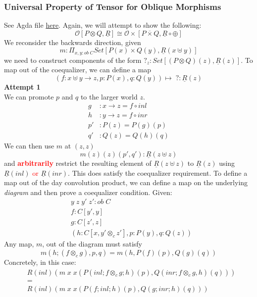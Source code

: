 \documentclass{article}
\newcommand{\red}[1]{\textcolor{red}{#1}}
\begin{document}
\subsubsection{Universal Property of Tensor for Oblique Morphisms}
See Agda file \href{https://github.com/bond15/Bunched-CBPV/blob/cc0cb155be26ca383343247485e462ec2377dfe6/src/Data/ConcreteFin.agda#L85}{here}.
Again, we will attempt to show the following:
\[
    \mathcal{O}[P \otimes Q , \underline{R}] \cong \mathcal{O\times}[P \overline{\times} Q , \underline{R} \circ \oplus]  
\]
We reconsider the backwards direction, given 
\[
    m : \Pi_{x , y : ob \;C} Set[P(x)\times Q(y), \underline{R}(x \uplus y)]
\]
we need to construct components of the form $?_z : Set[(P\otimes Q)(z),  \underline{R}(z)]$. 
To map out of the coequalizer, we can define a map
\[
    (f: x\uplus y \rightarrow z , p : P(x), q : Q(y)) \mapsto \; ? : \underline{R}(z)
\]
\textbf{Attempt 1}\\
We can promote $p$ and $q$ to the larger world $z$.
\begin{align*}
    g &: x \rightarrow z = f \circ inl \\
    h &: y \rightarrow z = f \circ inr \\
    p' &: P(z) = P(g)(p)\\
    q' &: Q(z) = Q(h)(q)
\end{align*}
We can then use $m$ at $(z , z)$
\[ 
    m(z)(z)(p' , q') : \underline{R}(z \uplus z)
\]
and \red{\textbf{arbitrarily}} restrict the resulting element of $\underline{R}(z \uplus z)$ to $\underline{R}(z)$ 
using $\underline{R}(inl)$ \red{or} $\underline{R}(inr)$. This does satisfy the coequalizer requirement. 
To define a map out of the day convolution product, we can define a map on the underlying \textit{diagram}
 and then prove a coequalizer condition. Given:
 \begin{align*}
    &y \;z \;y'\; z' : ob \;C \\
    &f : C[y' , y] \\ 
    &g : C[z' , z] \\
    &(h : C[x , y'\otimes_c z'], p : P(y), q: Q(z))
 \end{align*}
Any map, $m$, out of the diagram must satisfy
\[
    m (h ; (f \otimes_c g), p , q) = m (h , P(f)(p), Q(g)(q))
\]
Concretely, in this case:
\begin{align*}
    &R(inl)(m\;x \;x (P(inl ; f\otimes_c g ; h)(p) , Q(inr ; f\otimes_c g , h)(q)))  \\
    &=\\
    &R(inl)(m \;x \;x (P(f ; inl ; h)(p),Q(g ; inr ; h)(q)))
\end{align*}
\end{document}
